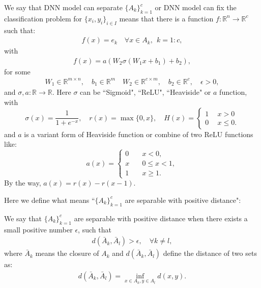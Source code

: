 \begin{definition}
We say that DNN model can separate $\{A_k\}_{k=1}^c$ or DNN model can fix the classification problem for $\{x_i ,y_i\}_{i \in I}$ means that there is a function $f: \mathbb{R}^n \to \mathbb{R}^c$ such that:
\begin{align}
f(x) = e_k \quad \forall x \in A_k, ~~ k = 1:c,
\end{align}
with 
\begin{align}
f(x) = a(W_2 \sigma(W_1 x + b_1) + b_2),
\end{align}
for some 
\begin{align}
W_1 \in \mathbb{R}^{m \times n}, \quad b_1 \in \mathbb{R}^m \quad W_2 \in \mathbb{R}^{c\times m}, \quad b_2 \in \mathbb{R}^c, \quad \epsilon > 0,
\end{align}
and $\sigma, a: \mathbb{R} \to \mathbb{R}$.
Here $\sigma$ can be ``Sigmoid", ``ReLU", ``Heaviside" or $a$ function, with
\begin{equation}
\sigma(x) = \frac{1}{1 + e^{-x}}, \quad r(x) = \max\{0,x\}, \quad H(x) = \begin{cases}
1 ~~ &x > 0 \\
0 ~~ &x \le 0.
\end{cases}
\end{equation}
and $a$ is a variant form of Heaviside function or combine of two ReLU functions like:
\begin{equation}
a(x) = \begin{cases}
0 \quad & x < 0, \\
x \quad & 0 \le x < 1, \\
1 \quad & x \ge 1.
\end{cases}
\end{equation}
By the way, $a(x) = r(x ) - r(x - 1).$

\end{definition}

Here we define what means ``$\{A_k\}_{k=1}^c$ are separable with positive distance":
\begin{definition}
We say that $\{A_k\}_{k=1}^c$ are separable with positive distance when there exists a small positive number $\epsilon$, such that
\begin{align}
d(\bar{A}_k, \bar{A}_l) > \epsilon, \quad \forall k \neq l,
\end{align}
where $\bar{A}_k$ means the closure of $A_k$ and $d(\bar{A}_k, \bar{A}_l)$ define the distance of two sets as:
\begin{align}
d(\bar{A}_k, \bar{A}_l) = \inf_{x \in A_k, y \in A_l} d(x,y).
\end{align}
\end{definition}

